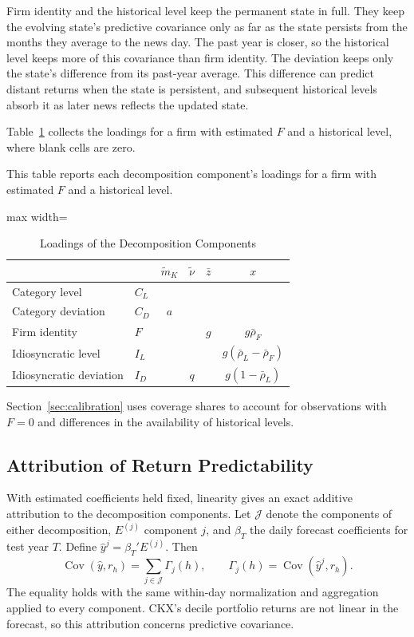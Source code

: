 \documentclass[11pt,letterpaper]{article}
\let\oldsubsection\subsection
\renewcommand{\subsection}{\FloatBarrier\oldsubsection}
\theoremstyle{remark}
\DeclareMathOperator{\Cov}{Cov}
\begin{document}
Firm identity and the historical level keep the permanent state in full. They keep the evolving state's predictive covariance only as far as the state persists from the months they average to the news day. The past year is closer, so the historical level keeps more of this covariance than firm identity. The deviation keeps only the state's difference from its past-year average. This difference can predict distant returns when the state is persistent, and subsequent historical levels absorb it as later news reflects the updated state.

Table~\ref{tab:D1} collects the loadings for a firm with estimated $F$ and a historical level, where blank cells are zero.

\begin{table}[htbp]
\centering
\caption{Loadings of the Decomposition Components}
\label{tab:D1}
\begin{minipage}{\linewidth}\footnotesize
This table reports each decomposition component's loadings for a firm with estimated $F$ and a historical level.
\end{minipage}
\medskip

{\footnotesize
\begin{adjustbox}{max width=\linewidth}
\begin{tabular}{llcccc}
\toprule
 &  & $\tilde m_K$ & $\tilde\nu$ & $\bar z$ & $x$ \\
\midrule
Category level & $C_L$ &  &  &  &  \\
Category deviation & $C_D$ & $a$ &  &  &  \\
Firm identity & $F$ &  &  & $g$ & $g\bar\rho_F$ \\
Idiosyncratic level & $I_L$ &  &  &  & $g(\bar\rho_L-\bar\rho_F)$ \\
Idiosyncratic deviation & $I_D$ &  & $q$ &  & $g(1-\bar\rho_L)$ \\
\bottomrule
\end{tabular}
\end{adjustbox}
}
\end{table}

Section~\ref{sec:calibration} uses coverage shares to account for observations with $F=0$ and differences in the availability of historical levels.

\subsection{Attribution of Return Predictability}

With estimated coefficients held fixed, linearity gives an exact additive attribution to the decomposition components. Let $\mathcal J$ denote the components of either decomposition, $E^{(j)}$ component $j$, and $\beta_T$ the daily forecast coefficients for test year $T$. Define $\hat y^j=\beta_T'E^{(j)}$. Then
\[
\Cov(\hat y,r_h)=\sum_{j\in\mathcal J}\Gamma_j(h),
\qquad
\Gamma_j(h)=\Cov(\hat y^j,r_h).
\]
The equality holds with the same within-day normalization and aggregation applied to every component. CKX's decile portfolio returns are not linear in the forecast, so this attribution concerns predictive covariance.
\end{document}
